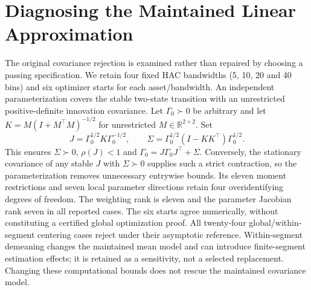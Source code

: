 \section{Diagnosing the Maintained Linear Approximation}
\label{sec:model_diagnostic_audit}
The original covariance rejection is examined rather than repaired by choosing a passing specification. We retain four fixed HAC bandwidths (5, 10, 20 and 40 bins) and six optimizer starts for each asset/bandwidth. An independent parameterization covers the stable two-state transition with an unrestricted positive-definite innovation covariance. Let $\Gamma_0\succ0$ be arbitrary and let $K=M(I+M^\top M)^{-1/2}$ for unrestricted $M\in\mathbb R^{2\times2}$. Set
\[
J=\Gamma_0^{1/2}K\Gamma_0^{-1/2},\qquad
\Sigma=\Gamma_0^{1/2}(I-KK^\top)\Gamma_0^{1/2}.
\]
This ensures $\Sigma\succ0$, $\rho(J)<1$ and $\Gamma_0=J\Gamma_0J^\top+\Sigma$. Conversely, the stationary covariance of any stable $J$ with $\Sigma\succ0$ supplies such a strict contraction, so the parameterization removes unnecessary entrywise bounds. Its eleven moment restrictions and seven local parameter directions retain four overidentifying degrees of freedom. The weighting rank is eleven and the parameter Jacobian rank seven in all reported cases. The six starts agree numerically, without constituting a certified global optimization proof. All twenty-four global/within-segment centering cases reject under their asymptotic reference. Within-segment demeaning changes the maintained mean model and can introduce finite-segment estimation effects; it is retained as a sensitivity, not a selected replacement. Changing these computational bounds does not rescue the maintained covariance model.

